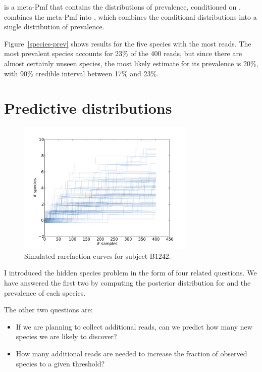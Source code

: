 \documentclass[12pt]{book}
\theoremstyle{exercise}
\begin{document}
 is a meta-Pmf that contains the distributions
of prevalence, conditioned on .  
combines the meta-Pmf into , which combines the
conditional distributions into a single distribution
of prevalence.

Figure~\ref{species-prev} shows results for the five
species with the most reads.  The most prevalent species accounts for
23\% of the 400 reads, but since there are almost certainly unseen
species, the most likely estimate for its prevalence is 20\%,
with 90\% credible interval between 17\% and 23\%.


\section{Predictive distributions}

\begin{figure}
\centerline{\includegraphics[height=2.5in]{figs/species-rare-B1242.pdf}}
\caption{Simulated rarefaction curves for subject B1242.}
\label{species-rare}
\end{figure}

I introduced the hidden species problem in the form of four related
questions.  We have answered the first two by computing the posterior
distribution for  and the prevalence of each species.

The other two questions are:

\begin{itemize}

\item If we are planning to collect additional reads, can we predict
  how many new species we are likely to discover?

\item How many additional reads are needed to increase the
  fraction of observed species to a given threshold?

\end{itemize}
\end{document}
